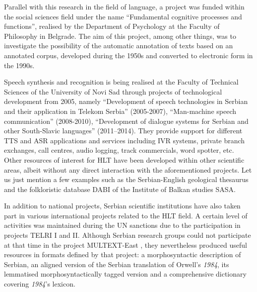 \begin{multicols}{2}
Parallel with this research in the field of language, a project was funded within the social sciences field under the name “Fundamental cognitive processes and functions”, realised by the Department of Psychology at the Faculty of Philosophy in Belgrade. The aim of this project, among other things, was to investigate the possibility of the automatic annotation of texts based on an annotated corpus, \cite{SRB_KORPUS} developed during the 1950s and converted to electronic form in the 1990s. 

Speech synthesis and recognition is being realised at the Faculty of Technical Sciences of the University of Novi Sad through projects of technological development from 2005, namely “Development of speech technologies in Serbian and their application in Telekom Serbia” (2005-2007), “Man-machine speech communication” (2008-2010), “Development of dialogue systems for Serbian and other South-Slavic languages” (2011--2014). They provide support for different TTS and ASR applications and services including IVR systems, private branch exchanges, call centres, audio logging, track commercials, word spotter, etc. Other resources of interest for HLT have been developed within other scientific areas, albeit without any direct interaction with the aforementioned projects. Let us just mention a few examples such as the Serbian-English geological thesaurus \cite{RGF} and the folkloristic database DABI of the Institute of Balkan studies SASA. \cite{BALKANINSTITUT} 


In addition to national projects, Serbian scientific institutions have also taken part in various international projects related to the HLT field. A certain level of activities was maintained during the UN sanctions due to the participation in projects TELRI I and II. \cite{TELRI} Although Serbian research groups could not participate at that time in the project MULTEXT-East \cite{NL}, they nevertheless produced useful resources in formats defined by that project: a morphosyntactic description of Serbian, an aligned version of the Serbian translation of Orwell’s \textit{1984}, its lemmatised morphosyntactically tagged version and a comprehensive dictionary covering \textit{1984}'s lexicon. 


\end{multicols}

